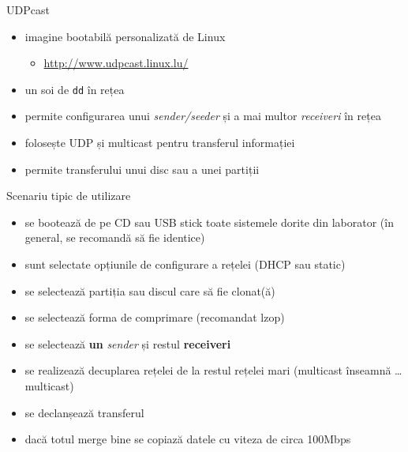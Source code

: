 \documentclass{beamer}
\begin{document}
\begin{frame}{UDPcast}
  \begin{itemize}
    \item imagine bootabilă personalizată de Linux
      \begin{itemize}
        \item \url{http://www.udpcast.linux.lu/}
      \end{itemize}
    \item un soi de \texttt{dd} în rețea
    \item permite configurarea unui \textit{sender/seeder} și a mai multor
      \textit{receiveri} în rețea
    \item folosește UDP și multicast pentru transferul informației
    \item permite transferului unui disc sau a unei partiții
  \end{itemize}
\end{frame}

\begin{frame}{Scenariu tipic de utilizare}
  \begin{itemize}
    \item se bootează de pe CD sau USB stick toate sistemele dorite din
      laborator (în general, se recomandă să fie identice)
    \item sunt selectate opțiunile de configurare a rețelei (DHCP sau static)
    \item se selectează partiția sau discul care să fie clonat(ă)
    \item se selectează forma de comprimare (recomandat lzop)
    \item se selectează \textbf{un} \textit{sender} și restul \textbf{receiveri}
    \item se realizează decuplarea rețelei de la restul rețelei mari
      (multicast înseamnă \ldots multicast)
    \item se declanșează transferul
    \item dacă totul merge bine se copiază datele cu viteza de circa 100Mbps
  \end{itemize}
\end{frame}
\end{document}
